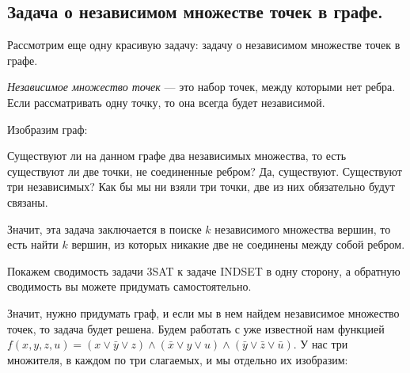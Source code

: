 \documentclass[russian]{lecture-notes}
\theoremstyle{definition}
\begin{document}
	\subsection*{Задача о независимом множестве точек в графе.}
		
		Рассмотрим еще одну красивую задачу: задачу о независимом множестве точек в графе. 
		
		\begin{definition}
			{\em Независимое множество точек }--- это набор точек, между которыми нет ребра. Если рассматривать одну точку, то она всегда будет независимой.
		\end{definition}
		
		\begin{example*} [Задача INDSET]
			
			Изобразим граф:
			
			\begin{figure} [H]
				\centering
			\end{figure}
		
			Существуют ли на данном графе два независимых множества, то есть существуют ли две точки, не соединенные ребром? Да, существуют. Существуют три независимых? Как бы мы ни взяли три точки, две из них обязательно будут связаны. 
		
		\end{example*}	
		
		Значит, эта задача заключается в поиске $k$ независимого множества вершин, то есть найти $k$ вершин, из которых никакие две не соединены между собой ребром. 
			
		Покажем сводимость задачи 3SAT к задаче INDSET в одну сторону, а обратную сводимость вы можете придумать самостоятельно.  
			
		Значит, нужно придумать граф, и если мы в нем найдем независимое множество точек, то задача будет решена.
		Будем работать с уже известной нам функцией $f(x, y, z, u) = (x \vee \bar{y} \vee z) \wedge (\bar{x} \vee y \vee u) \wedge (\bar{y} \vee \bar{z} \vee \bar{u})$. У нас три множителя, в каждом по три слагаемых, и мы отдельно их изобразим: 
		
\end{document}
